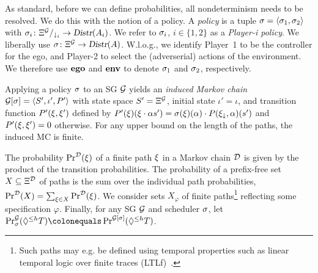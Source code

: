 {{%
As standard, before we can define probabilities, all nondeterminism needs to be resolved. We do this with the notion of a policy. A \emph{policy} is a tuple $\sched = \langle \sched_1, \sched_2 \rangle$ with $\sched_i \colon \PiPaths[]{\sg} \rightarrow \Distr(\Act_i)$. We refer to $\sched_i$, $i \in \{ 1, 2 \}$ as a \emph{Player-i policy}. We liberally use $\sched \colon \Paths{\sg} \rightarrow \Distr(\Act)$.
W.l.o.g., we identify Player~1 to be the controller for the ego, and Player-2 to select the (adverserial) actions of the environment.  
We therefore use $\pOneSched$ and $\pTwoSched$ to denote $\sched_1$ and $\sched_2$, respectively. 

Applying a policy $\sched$ to an SG $\sg$ yields an \emph{induced Markov chain} $\induced{\sg}{\sched} = \langle S', \iota', P' \rangle$ with state space $S' = \Paths{\sg}$, initial state $\iota' = \iota$, and transition function $P'(\path,\path')$ defined by $P'(\path)(\path \cdot \act s') = \sched(\path)(\act) \cdot P(\last{\path},\act)(s')$ and $P'(\path,\path') = 0$ otherwise. For any upper bound on the length of the paths, the induced MC is finite. 


\begin{example}
	
\end{example}


The probability $\Pr^\mc(\path)$ of a finite path $\path$ in a Markov chain $\mc$ is given by the product of the transition probabilities.
The probability of a prefix-free set $X \subseteq \Paths{\mc}$  of paths is the sum over the individual path probabilities, $\Pr^\mc(X) = \sum_{\path \in X} \Pr^\mc(\path)$.
We consider sets $X_\varphi$ of finite paths\footnote{Such paths may e.g. be defined using temporal properties such as linear temporal logic over finite traces (LTLf)~\cite{}.} reflecting some specification $\varphi$.   
Finally, for any SG $\sg$ and scheduler $\sched$, let $\Pr^\sg_\sched(\eventually{h} T) \colonequals \Pr^{\induced{\sg}{\sched}}(\eventually{h} T)$.  

\begin{example}
	
\end{example}

}}

